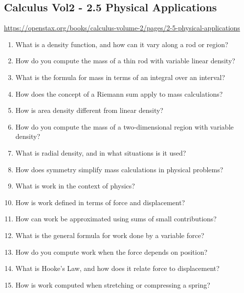 \subsection{Calculus Vol2 - 2.5 Physical Applications}

\url{https://openstax.org/books/calculus-volume-2/pages/2-5-physical-applications}

\begin{enumerate}

\item What is a density function, and how can it vary along a rod or region?

\item How do you compute the mass of a thin rod with variable linear density?

\item What is the formula for mass in terms of an integral over an interval?

\item How does the concept of a Riemann sum apply to mass calculations?

\item How is area density different from linear density?

\item How do you compute the mass of a two-dimensional region with variable density?

\item What is radial density, and in what situations is it used?

\item How does symmetry simplify mass calculations in physical problems?

\item What is work in the context of physics?

\item How is work defined in terms of force and displacement?

\item How can work be approximated using sums of small contributions?

\item What is the general formula for work done by a variable force?

\item How do you compute work when the force depends on position?

\item What is Hooke’s Law, and how does it relate force to displacement?

\item How is work computed when stretching or compressing a spring?


\end{enumerate}
